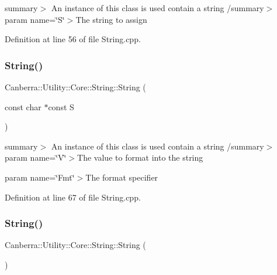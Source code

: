 summary$>$ An instance of this class is used contain a string /summary$>$ param name=\char`\"{}\+S\char`\"{}$>$The string to assign

Definition at line 56 of file String.\+cpp.

\mbox{\label{class_canberra_1_1_utility_1_1_core_1_1_string_aea095c5ed108309da77168c8d933c72e_aea095c5ed108309da77168c8d933c72e}} 
\subsubsection{\texorpdfstring{String()}{String()}\hspace{0.1cm}{\footnotesize\ttfamily [2/6]}}
{\footnotesize\ttfamily Canberra\+::\+Utility\+::\+Core\+::\+String\+::\+String (\begin{DoxyParamCaption}\item[{const char $\ast$const}]{S }\end{DoxyParamCaption})\hspace{0.3cm}{\ttfamily [explicit]}}

summary$>$ An instance of this class is used contain a string /summary$>$ param name=\char`\"{}\+V\char`\"{}$>$The value to format into the string

param name=\char`\"{}\+Fmt\char`\"{}$>$The format specifier

Definition at line 67 of file String.\+cpp.

\mbox{\label{class_canberra_1_1_utility_1_1_core_1_1_string_ab8ed4a495eaea8f65d7151289bd11cc0_ab8ed4a495eaea8f65d7151289bd11cc0}} 
\subsubsection{\texorpdfstring{String()}{String()}\hspace{0.1cm}{\footnotesize\ttfamily [3/6]}}
{\footnotesize\ttfamily Canberra\+::\+Utility\+::\+Core\+::\+String\+::\+String (\begin{DoxyParamCaption}{ }\end{DoxyParamCaption})\hspace{0.3cm}{\ttfamily [explicit]}}

